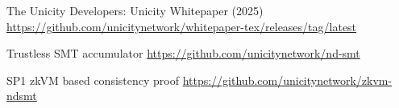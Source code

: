 \documentclass[twocolumn]{article}
\begin{document}
\begin{thebibliography}{9}

 The Unicity Developers: Unicity Whitepaper (2025) \url{https://github.com/unicitynetwork/whitepaper-tex/releases/tag/latest}

 Trustless SMT accumulator \url{https://github.com/unicitynetwork/nd-smt}

 SP1 zkVM based consistency proof \url{https://github.com/unicitynetwork/zkvm-ndsmt}

\end{thebibliography}
\end{document}
